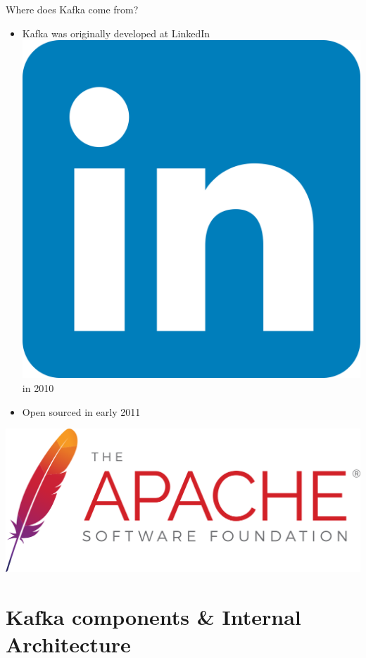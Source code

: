 \documentclass{beamer}
\begin{document}
\begin{frame}{Where does Kafka come from?}
  \begin{itemize}
    \item Kafka was originally developed at LinkedIn \includegraphics[scale=0.006]{fig/linkedin_logo.png} in 2010
    \item Open sourced in early 2011
  \end{itemize}
  \includegraphics[scale=0.17]{fig/apache_software.png}
\end{frame}

\section[Kafka components \& Internal Architecture]{Kafka components \& Internal Architecture}
\end{document}
